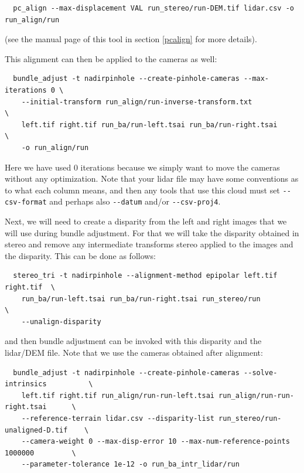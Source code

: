 \begin{verbatim}
  pc_align --max-displacement VAL run_stereo/run-DEM.tif lidar.csv -o run_align/run 
\end{verbatim}

(see the manual page of this tool in section \ref{pcalign} for more details). 

This alignment can then be applied to the cameras as well:

\begin{verbatim}
  bundle_adjust -t nadirpinhole --create-pinhole-cameras --max-iterations 0 \
    --initial-transform run_align/run-inverse-transform.txt                 \
    left.tif right.tif run_ba/run-left.tsai run_ba/run-right.tsai           \
    -o run_align/run
\end{verbatim}

Here we have used 0 iterations because we simply want to move the cameras
without any optimization. Note that your lidar file may have some conventions as to what each column
means, and then any tools that use this cloud must set \texttt{-\/-csv-format}
and perhaps also \texttt{-\/-datum} and/or \texttt{-\/-csv-proj4}. 

Next, we will need to create a disparity from the left and right images
that we will use during bundle adjustment. For that we will take the disparity obtained
in stereo and remove any intermediate transforms stereo applied to the
images and the disparity. This can be done as follows:

\begin{verbatim}
  stereo_tri -t nadirpinhole --alignment-method epipolar left.tif right.tif  \
    run_ba/run-left.tsai run_ba/run-right.tsai run_stereo/run                \
    --unalign-disparity 
\end{verbatim}

and then bundle adjustment can be invoked with this disparity and
the lidar/DEM file. Note that we use the cameras obtained after alignment:

\begin{verbatim}
  bundle_adjust -t nadirpinhole --create-pinhole-cameras --solve-intrinsics          \
    left.tif right.tif run_align/run-run-left.tsai run_align/run-run-right.tsai      \
    --reference-terrain lidar.csv --disparity-list run_stereo/run-unaligned-D.tif    \
    --camera-weight 0 --max-disp-error 10 --max-num-reference-points 1000000         \
    --parameter-tolerance 1e-12 -o run_ba_intr_lidar/run
\end{verbatim}

